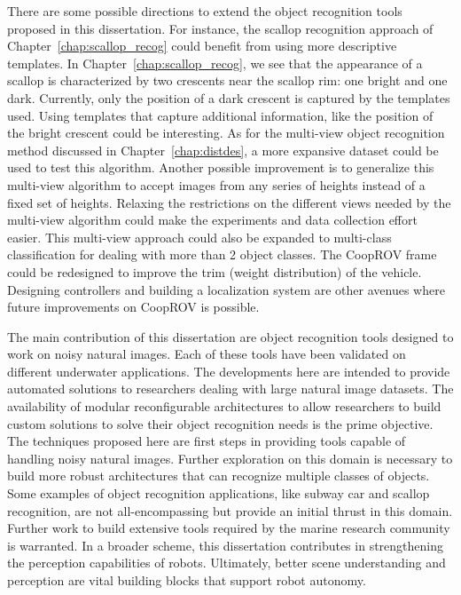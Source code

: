 There are some possible directions to extend the object recognition tools proposed in this dissertation. For instance, the scallop recognition approach of Chapter~\ref{chap:scallop_recog} could benefit from using more descriptive 
templates. In Chapter~\ref{chap:scallop_recog}, we see that the appearance of a scallop is characterized by two crescents near the scallop rim: one bright and one dark. Currently, only the position of a dark crescent is captured by the templates used. Using templates that capture additional information, like the position of the bright crescent could be interesting. As for the multi-view object recognition method discussed in Chapter~\ref{chap:distdes}, a more expansive dataset could be used to test this algorithm. Another possible improvement is to generalize this multi-view algorithm to accept images from any series of heights instead of a fixed set of heights. Relaxing the restrictions on the different views needed by the multi-view algorithm could make the experiments and data collection effort easier. This multi-view approach could also be expanded to multi-class classification for dealing with more than 2 object classes. The CoopROV frame could be redesigned to improve the trim (weight distribution) of 
the vehicle. Designing controllers and building a localization system are other avenues where future improvements on CoopROV is possible.

The main contribution of this dissertation are object recognition tools designed to work on noisy natural images. Each of these tools have been validated on different underwater applications. The developments here are intended to provide automated solutions to researchers dealing with large natural image datasets.
The availability of modular reconfigurable architectures to allow researchers to build custom solutions to solve their object recognition needs is the prime objective. The techniques proposed here are first steps in providing tools capable of handling noisy natural images. Further exploration on this domain is necessary to build more robust architectures that can recognize multiple classes of objects. Some examples of object recognition applications, like subway car and scallop recognition, are not all-encompassing but provide an initial thrust in this domain. Further work to build extensive tools required by the marine research community is warranted. In a broader scheme, this dissertation contributes in strengthening the perception capabilities of robots. Ultimately, better scene understanding and perception are vital building blocks that support robot autonomy.

